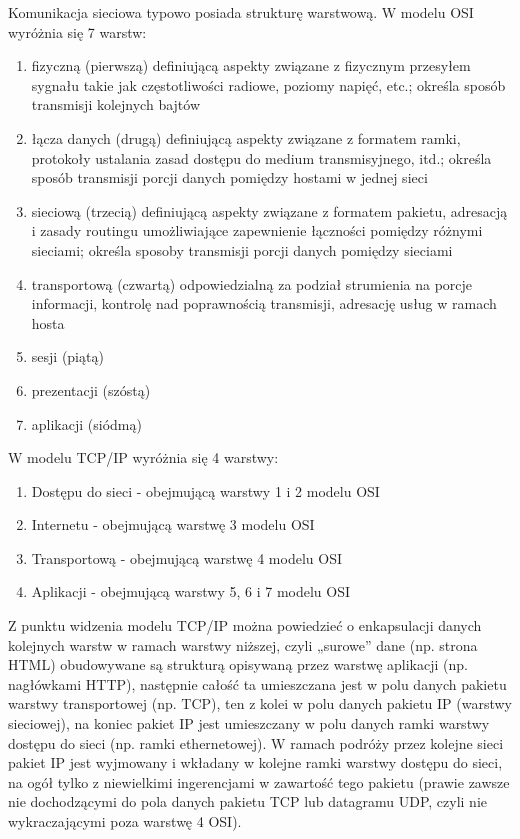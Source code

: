 Komunikacja sieciowa typowo posiada strukturę warstwową. W modelu OSI wyróżnia się 7 warstw:
\begin{enumerate}
	\item fizyczną (pierwszą) definiującą aspekty związane z fizycznym przesyłem sygnału takie jak częstotliwości radiowe, poziomy napięć, etc.;
		określa sposób transmisji kolejnych bajtów
	\item łącza danych (drugą) definiującą aspekty związane z formatem ramki, protokoły ustalania zasad dostępu do medium transmisyjnego, itd.;
		określa sposób transmisji porcji danych pomiędzy hostami w jednej sieci
	\item sieciową (trzecią) definiującą aspekty związane z formatem pakietu, adresacją i zasady routingu umożliwiające zapewnienie łączności pomiędzy różnymi sieciami;
		określa sposoby transmisji porcji danych pomiędzy sieciami
	\item transportową (czwartą) odpowiedzialną za podział strumienia na porcje informacji, kontrolę nad poprawnością transmisji, adresację usług w ramach hosta
	\item sesji (piątą)
	\item prezentacji (szóstą)
	\item aplikacji (siódmą)
\end{enumerate}


\noindent
W modelu TCP/IP wyróżnia się 4 warstwy:
\begin{enumerate}
	\item Dostępu do sieci - obejmującą warstwy 1 i 2 modelu OSI
	\item Internetu - obejmującą warstwę 3 modelu OSI
	\item Transportową - obejmującą warstwę 4 modelu OSI
	\item Aplikacji - obejmującą warstwy 5, 6 i 7 modelu OSI
\end{enumerate}

\noindent
Z punktu widzenia modelu TCP/IP można powiedzieć o enkapsulacji danych kolejnych warstw w ramach warstwy niższej, czyli „surowe” dane (np. strona HTML) obudowywane są strukturą opisywaną przez warstwę aplikacji (np. nagłówkami HTTP), następnie całość ta umieszczana jest w polu danych pakietu warstwy transportowej (np. TCP), ten z kolei w polu danych pakietu IP (warstwy sieciowej), na koniec pakiet IP jest umieszczany w polu danych ramki warstwy dostępu do sieci (np. ramki ethernetowej). W ramach podróży przez kolejne sieci pakiet IP jest wyjmowany i wkładany w kolejne ramki warstwy dostępu do sieci, na ogół tylko z niewielkimi ingerencjami w zawartość tego pakietu (prawie zawsze nie dochodzącymi do pola danych pakietu TCP lub datagramu UDP, czyli nie wykraczającymi poza warstwę 4 OSI).

